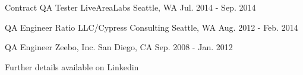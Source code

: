 \begin{cventries}
\cventry
{Contract QA Tester} %
{LiveAreaLabs} %
{Seattle, WA} %
{Jul. 2014 - Sep. 2014} %
{}

\cventry
{QA Engineer} %
{Ratio LLC/Cypress Consulting} %
{Seattle, WA} %
{Aug. 2012 - Feb. 2014} %
{}

\cventry
{QA Engineer} %
{Zeebo, Inc.} %
{San Diego, CA} %
{Sep. 2008 - Jan. 2012} %
{}

\cventry
{} %
{Further details available on Linkedin} %
{} %
{} %
{}

\end{cventries}
